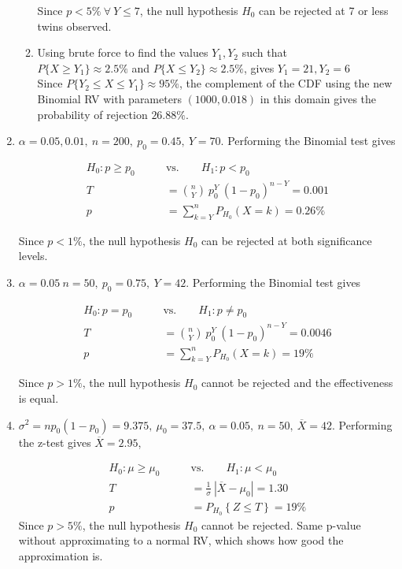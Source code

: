 \begin{enumerate}
\begin{enumerate}
		Since $ p < 5\%\ \forall\ Y \leq 7 $, the null hypothesis $ H_0 $ can be rejected at 7 or less twins observed.
		
		\item Using brute force to find the values $ Y_1, Y_2 $ such that \\
		$ P\{X \geq Y_1\} \approx 2.5\% $ and $ P\{X \leq Y_2\} \approx 2.5\% $, gives $ Y_1 = 21, Y_2 = 6 $\\
		
		Since $ P\{Y_2 \leq X \leq Y_1\} \approx 95\%$, the complement of the CDF using the new Binomial RV with parameters $ (1000, 0.018) $ in this domain gives the probability of rejection $ 26.88\% $.
		
		
	\end{enumerate}
	
	
	\item $\alpha = 0.05, 0.01,\ n = 200,\ p_0 = 0.45,\ Y = 70$. Performing the Binomial test gives
	
	\begin{align}
		H_0 : p  \geq p_0 \qquad &\text{vs.} \qquad H_1 : p < p_0 \nonumber \\
		T &= \binom{n}{Y}\ p_0^Y\ (1-p_0)^{n-Y}  = 0.001 \nonumber \\
		p &= \sum\limits_{k = Y}^{n} P_{H_0}(X = k) = 0.26\%
	\end{align}
	
	Since $ p < 1\% $, the null hypothesis $ H_0 $ can be rejected at both significance levels.
	
	\item $\alpha = 0.05\ n = 50,\ p_0 = 0.75,\ Y = 42$. Performing the Binomial test gives
	
	\begin{align}
		H_0 : p = p_0 \qquad &\text{vs.} \qquad H_1 : p \neq p_0 \nonumber \\
		T &= \binom{n}{Y}\ p_0^Y\ (1-p_0)^{n-Y}  = 0.0046 \nonumber \\
		p &= \sum\limits_{k = Y}^{n} P_{H_0}(X = k) = 19\%
	\end{align}
	
	Since $ p > 1\% $, the null hypothesis $ H_0 $ cannot be rejected and the effectiveness is equal.
	
	\item $ \sigma^2 = np_0(1-p_0) = 9.375,\ \mu_0 = 37.5,\ \alpha = 0.05,\ n = 50,\ \overline{X} = 42$. Performing the z-test gives $ \overline{X} = 2.95 $,
	
	\begin{align}
		H_0 : \mu \geq \mu_0 \qquad &\text{vs.} \qquad H_1 : \mu < \mu_0 \nonumber \\
		T &= \frac{1}{\sigma}\ |\overline{X} - \mu_0| = 1.30 \nonumber \\
		p &= P_{H_0}\left\{Z \leq T\right\} = 19\% 
	\end{align}
	Since $ p > 5\% $, the null hypothesis $ H_0 $ cannot be rejected. Same p-value without approximating to a normal RV, which shows how good the approximation is.
	

\end{enumerate}
